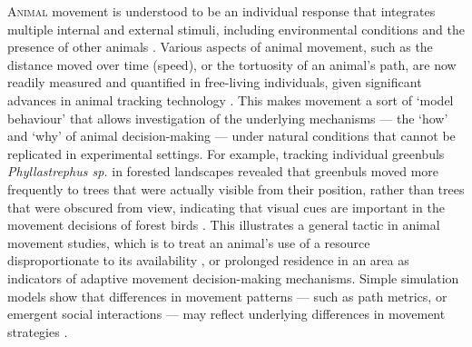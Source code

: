 
\newrefcontext[sorting=ynt]

    \lettrine{A}{nimal} movement is understood to be an individual response that integrates multiple internal and external stimuli, including environmental conditions and the presence of other animals \citep{nathan2008a}.
    Various aspects of animal movement, such as the distance moved over time (speed), or the tortuosity of an animal's path, are now readily measured and quantified in free-living individuals, given significant advances in animal tracking technology \citep[][see Nathan et al. \textit{in prep.}]{cagnacci2010}.
    This makes movement a sort of `model behaviour' that allows investigation of the underlying mechanisms --- the `how' and `why' of animal decision-making --- under natural conditions that cannot be replicated in experimental settings.
    For example, tracking individual greenbuls \textit{Phyllastrephus sp.} in forested landscapes revealed that greenbuls moved more frequently to trees that were actually visible from their position, rather than trees that were obscured from view, indicating that visual cues are important in the movement decisions of forest birds \citep[][see also \citep{aben2018}]{aben2021}.
    This illustrates a general tactic in animal movement studies, which is to treat an animal's use of a resource disproportionate to its availability \citep{manly2007,fortin2005,signer2019}, or prolonged residence in an area \citep{bracis2018} as indicators of adaptive movement decision-making mechanisms.
    Simple simulation models show that differences in movement patterns --- such as path metrics, or emergent social interactions --- may reflect underlying differences in movement strategies \citep{spiegel2017}.
    
